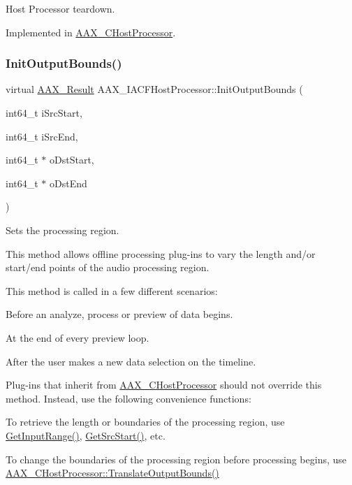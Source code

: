 Host Processor teardown. 



Implemented in \mbox{\hyperlink{a01485_a0152f823c0f40fb55230ee4cde0dac68}{A\+A\+X\+\_\+\+C\+Host\+Processor}}.

\mbox{\label{a01693_a157bab3b949dc98f02e66c907c419bad}} 
\subsubsection{\texorpdfstring{InitOutputBounds()}{InitOutputBounds()}}
{\footnotesize\ttfamily virtual \mbox{\hyperlink{a00392_a4d8f69a697df7f70c3a8e9b8ee130d2f}{A\+A\+X\+\_\+\+Result}} A\+A\+X\+\_\+\+I\+A\+C\+F\+Host\+Processor\+::\+Init\+Output\+Bounds (\begin{DoxyParamCaption}\item[{int64\+\_\+t}]{i\+Src\+Start,  }\item[{int64\+\_\+t}]{i\+Src\+End,  }\item[{int64\+\_\+t $\ast$}]{o\+Dst\+Start,  }\item[{int64\+\_\+t $\ast$}]{o\+Dst\+End }\end{DoxyParamCaption})\hspace{0.3cm}{\ttfamily [pure virtual]}}



Sets the processing region. 

This method allows offline processing plug-\/ins to vary the length and/or start/end points of the audio processing region.

This method is called in a few different scenarios\+:
\begin{DoxyItemize}
\item Before an analyze, process or preview of data begins.
\item At the end of every preview loop.
\item After the user makes a new data selection on the timeline.
\end{DoxyItemize}

Plug-\/ins that inherit from \mbox{\hyperlink{a01485}{A\+A\+X\+\_\+\+C\+Host\+Processor}} should not override this method. Instead, use the following convenience functions\+:
\begin{DoxyItemize}
\item To retrieve the length or boundaries of the processing region, use \mbox{\hyperlink{a01485_a2b93d94600b7d356bba14e070b8b40a3}{Get\+Input\+Range()}}, \mbox{\hyperlink{a01485_aec4fa455a4e8ecccc245ce30b596c7b4}{Get\+Src\+Start()}}, etc.
\item To change the boundaries of the processing region before processing begins, use \mbox{\hyperlink{a01485_a4d793e60071069e6f98c4d841d37ac96}{A\+A\+X\+\_\+\+C\+Host\+Processor\+::\+Translate\+Output\+Bounds()}}
\end{DoxyItemize}

